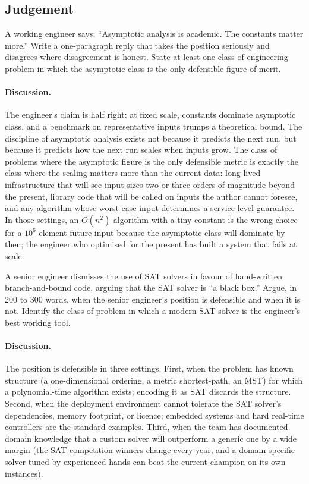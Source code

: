 \subsection*{Judgement}

\begin{exercise}
A working engineer says: ``Asymptotic analysis is academic. The
constants matter more.'' Write a one-paragraph reply that takes the
position seriously and disagrees where disagreement is honest.
State at least one class of engineering problem in which the
asymptotic class is the only defensible figure of merit.
\end{exercise}

\paragraph{Discussion.}
The engineer's claim is half right: at fixed scale, constants
dominate asymptotic class, and a benchmark on representative
inputs trumps a theoretical bound. The discipline of asymptotic
analysis exists not because it predicts the next run, but because
it predicts how the next run scales when inputs grow. The class
of problems where the asymptotic figure is the only defensible
metric is exactly the class where the scaling matters more than the
current data: long-lived infrastructure that will see input sizes
two or three orders of magnitude beyond the present, library code
that will be called on inputs the author cannot foresee, and any
algorithm whose worst-case input determines a service-level
guarantee. In those settings, an $O(n^{2})$ algorithm with a tiny
constant is the wrong choice for a $10^{6}$-element future input
because the asymptotic class will dominate by then; the engineer
who optimised for the present has built a system that fails at
scale.

\begin{exercise}
A senior engineer dismisses the use of SAT solvers in favour of
hand-written branch-and-bound code, arguing that the SAT solver is
``a black box.'' Argue, in 200 to 300 words, when the senior
engineer's position is defensible and when it is not. Identify the
class of problem in which a modern SAT solver is the engineer's
best working tool.
\end{exercise}

\paragraph{Discussion.}
The position is defensible in three settings. First, when the
problem has known structure (a one-dimensional ordering, a metric
shortest-path, an MST) for which a polynomial-time algorithm
exists; encoding it as SAT discards the structure. Second, when
the deployment environment cannot tolerate the SAT solver's
dependencies, memory footprint, or licence; embedded systems and
hard real-time controllers are the standard examples. Third, when
the team has documented domain knowledge that a custom solver
will outperform a generic one by a wide margin (the SAT
competition winners change every year, and a domain-specific
solver tuned by experienced hands can beat the current champion
on its own instances).

